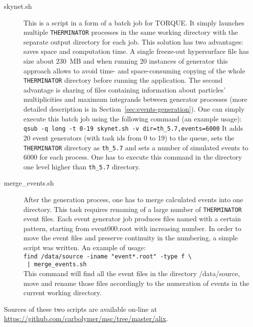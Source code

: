     \begin{description}
      \item[skynet.sh] This is a script in a form of a batch job for TORQUE.
        It simply launches multiple \verb|THERMINATOR| processes in the same working directory with the separate output directory for each job.
        This solution has two advantages: saves space and computation time.
        A single freeze-out hypersurface file has size about 230~MB and when running 20 instances of generator this approach allows to avoid time- and space-consuming copying of the whole \verb|THERMINATOR| directory before running the application.
        The second advantage is sharing of files containing information about particles' multiplicities and maximum integrands between generator processes (more detailed description is in Section~\ref{sec:events-generation}).
        One can simply execute this batch job using the following command (an example usage):
        \\\verb|qsub -q long -t 0-19 skynet.sh -v dir=th_5.7,events=6000|
        It adds 20 event generators (with task ids from 0 to 19) to the queue, sets the \verb|THERMINATOR| directory as \verb|th_5.7| and sets a number of simulated events to 6000 for each process.
        One has to execute this command in the directory one level higher than \verb|th_5.7| directory.
      \item[merge\_events.sh] After the generation process, one has to merge calculated events into one directory.
        This task requires renaming of a large number of \verb|THERMINATOR| event files.
        Each event generator job produces files named with a certain pattern, starting from event000.root with increasing number.
        In order to move the event files and preserve continuity in the numbering, a simple script was written.
        An example of usage:
        \\\verb&find /data/source -iname "event*.root" -type f \ &
        \\\verb& | merge_events.sh&\\
        This command will find all the event files in the directory /data/source, move and rename those files accordingly to the numeration of events in the current working directory.
    \end{description}
    Sources of these two scripts are available on-line at \url{https://github.com/carbolymer/msc/tree/master/alix}.
